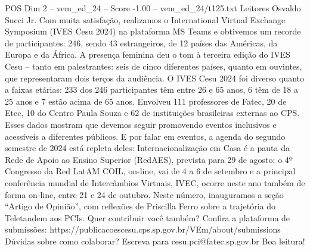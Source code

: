 \begin{textsample}{POS Dim 2 – vem\_ed\_24 – Score -1.00 – vem\_ed\_24/t125.txt}  \label{ex:f2_pos_049}
Leitores Osvaldo Succi Jr.
Com muita satisfação, realizamos o International Virtual Exchange Symposium (IVES Cesu 2024) na plataforma MS Teams e obtivemos um recorde de participantes: 246, sendo 43 estrangeiros, de 12 países das Américas, da Europa e da África.
A presença feminina deu o tom à terceira edição do IVES Cesu – tanto em palestrantes: seis de cinco diferentes países, quanto em ouvintes, que representaram dois terços da audiência.
O IVES Cesu 2024 foi diverso quanto a faixas etárias: 233 dos 246 participantes têm entre 26 e 65 anos, 6 têm de 18 a 25 anos e 7 estão acima de 65 anos.
Envolveu 111 professores de Fatec, 20 de Etec, 10 do Centro Paula Souza e 62 de instituições brasileiras externas ao CPS.
Esses dados mostram que devemos seguir promovendo eventos inclusivos e acessíveis a diferentes públicos.
E por falar em eventos, a agenda do segundo semestre de 2024 está repleta deles: Internacionalização em Casa é a pauta da Rede de Apoio ao Ensino Superior (RedAES), prevista para 29 de agosto; o 4º Congresso da Red LatAM COIL, on-line, vai de 4 a 6 de setembro e a principal conferência mundial de Intercâmbios Virtuais, IVEC, ocorre neste ano também de forma on-line, entre 21 e 24 de outubro.
Neste número, inauguramos a seção “Artigo de Opinião”, com reflexões de Priscilla Ferro sobre a trajetória do Teletandem aos PCIs.
Quer contribuir você também?
Confira a plataforma de submissões: https://publicacoescesu.cps.sp.gov.br/VEm/about/submissions Dúvidas sobre como colaborar?
Escreva para cesu.pci@fatec.sp.gov.br Boa leitura!

\end{textsample}
